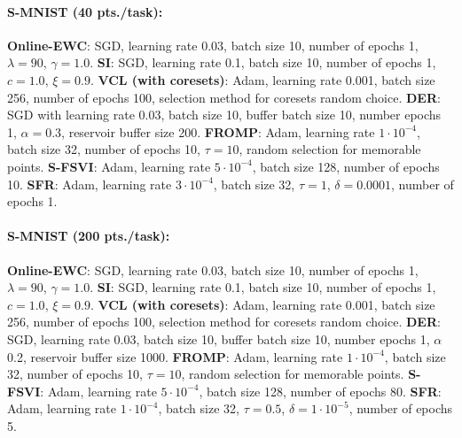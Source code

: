 \documentclass{article} %
\begin{document}
\paragraph{S-MNIST (40 pts./task):}
	\textbf{Online-EWC}: SGD, learning rate $0.03$, batch size  10, number of epochs 1, $\lambda=90$, $\gamma=1.0$.
	\textbf{SI}: SGD, learning rate 0.1, batch size 10, number of epochs 1, $c=1.0$, $\xi=0.9$.
	\textbf{VCL (with coresets)}: Adam, learning rate 0.001, batch size 256, number of epochs 100, selection method for coresets random choice.
	\textbf{DER}: SGD with learning rate 0.03, batch size 10, buffer batch size 10, number epochs 1, $\alpha=0.3$, reservoir buffer size 200.
	\textbf{FROMP}: Adam, learning rate $1 \cdot 10^{-4}$, batch size 32, number of epochs 10, $\tau = 10$, random selection for memorable points.
	\textbf{S-FSVI}: Adam, learning rate $5 \cdot 10^{-4}$, batch size 128, number of epochs 10.
	\textbf{SFR}: Adam, learning rate $3 \cdot 10^{-4}$, batch size 32, $\tau=1$, $\delta=0.0001$, number of epochs 1.


\paragraph{S-MNIST (200 pts./task):}
	\textbf{Online-EWC}: SGD, learning rate $0.03$, batch size  10, number of epochs 1, $\lambda=90$, $\gamma=1.0$.
	\textbf{SI}: SGD, learning rate 0.1, batch size 10, number of epochs 1, $c=1.0$, $\xi=0.9$.
	\textbf{VCL (with coresets)}: Adam, learning rate 0.001, batch size 256, number of epochs 100, selection method for coresets random choice.
	\textbf{DER}: SGD, learning rate 0.03, batch size 10, buffer batch size 10, number epochs 1, $\alpha$ 0.2, reservoir buffer size 1000.
	\textbf{FROMP}: Adam, learning rate $1 \cdot 10^{-4}$, batch size 32, number of epochs 10, $\tau = 10$, random selection for memorable points.
	\textbf{S-FSVI}: Adam, learning rate $5 \cdot 10^{-4}$, batch size 128, number of epochs 80.
	\textbf{SFR}: Adam, learning rate $1 \cdot 10^{-4}$, batch size 32, $\tau=0.5$, $\delta=1 \cdot 10^{-5}$, number of epochs 5.

\end{document}
